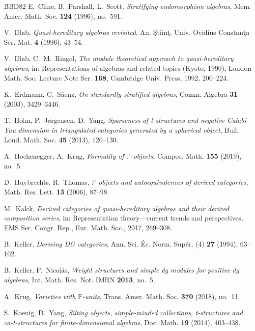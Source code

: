 \documentclass[11pt,reqno]{amsart}
\theoremstyle{plain}
\theoremstyle{definition}
\theoremstyle{remark}
\begin{document}
\begin{thebibliography}{BBD82}
E.~Cline, B.~Parshall, L.~Scott, \emph{Stratifying endomorphism algebras}, Mem. Amer. Math. Soc. \textbf{124} (1996), no.~591.

V.~Dlab, \emph{Quasi-hereditary algebras revisited}, An. \c{S}tiin\c{t}. Univ. Ovidius Constan\c{t}a Ser. Mat. \textbf{4} (1996), 43--54.

V.~Dlab, C.~M.~Ringel, \emph{The module theoretical approach to quasi-hereditary algebras}, in: Representations of algebras and related topics (Kyoto, 1990), London Math. Soc. Lecture Note Ser. \textbf{168}, Cambridge Univ. Press, 1992, 200--224.

K.~Erdmann, C.~S\'aenz, \emph{On standardly stratified algebras}, Comm. Algebra \textbf{31} (2003), 3429--3446.

T.~Holm, P.~J\o rgensen, D.~Yang, \emph{Sparseness of t-structures and negative Calabi--Yau dimension in triangulated categories generated by a spherical object}, Bull. Lond. Math. Soc. \textbf{45} (2013), 120--130.

A.~Hochenegger, A.~Krug, \emph{Formality of $\mathbb{P}$-objects}, Compos. Math. \textbf{155} (2019), no.~5.

D.~Huybrechts, R.~Thomas, \emph{$\mathbb{P}$-objects and autoequivalences of derived categories}, Math. Res. Lett. \textbf{13} (2006), 87--98.

M.~Kalck, \emph{Derived categories of quasi-hereditary algebras and their derived composition series}, in: Representation theory---current trends and perspectives, EMS Ser. Congr. Rep., Eur. Math. Soc., 2017, 269--308.

B.~Keller, \emph{Deriving DG categories}, Ann. Sci. \'Ec. Norm. Sup\'er. (4) \textbf{27} (1994), 63--102.

B.~Keller, P.~Nicol\'as, \emph{Weight structures and simple dg modules for positive dg algebras}, Int. Math. Res. Not. IMRN \textbf{2013}, no.~5.

A.~Krug, \emph{Varieties with $\mathbb{P}$-units}, Trans. Amer. Math. Soc. \textbf{370} (2018), no.~11.

S.~Koenig, D.~Yang, \emph{Silting objects, simple-minded collections, t-structures and co-t-structures for finite-dimensional algebras}, Doc. Math. \textbf{19} (2014), 403--438.


\end{thebibliography}
\end{document}
